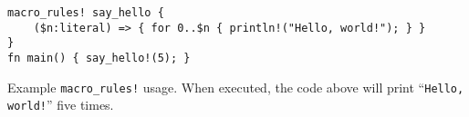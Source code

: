 \begin{listing}
    \centering
    \begin{verbatim}
macro_rules! say_hello {
    ($n:literal) => { for 0..$n { println!("Hello, world!"); } }
}
fn main() { say_hello!(5); }
    \end{verbatim}
    \caption{Example \texttt{macro\_rules!} usage.
        When executed, the code above will print “\texttt{Hello, world!}” five times.}
    \label{lst:rust-macro-rules}
\end{listing}